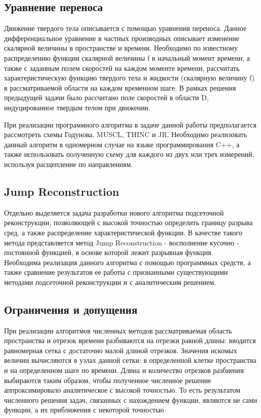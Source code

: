\documentclass[12pt,a4paper]{article}
\begin{document}
\subsection{Уравнение переноса}
Движение твердого тела описывается с помощью уравнения переноса. Данное дифференциальное уравнение в частных производных описывает изменение скалярной величины в пространстве и времени. 
Необходимо по известному распределению функции скалярной величины f в начальный момент времени, а также с заданным полем скоростей на каждом моменте времени, рассчитать характеристическую функцию твердого тела и жидкости (скалярную величину f) в рассматриваемой области на каждом временном шаге. В рамках решения предыдущей задачи было рассчитано поле скоростей в области D, индуцированное твердым телом при движении.

При реализации программного алгоритма в задаче данной работы предполагается рассмотреть схемы Годунова, MUSCL, THINC и JR. Необходимо реализовать данный алгоритм в одномерном случае на языке программирования C++, а также использовать полученную схему для каждого из двух или трех измерений, используя расщепление по направлениям.

\subsection{Jump Reconstruction}
Отдельно выделяется задача разработки нового алгоритма подсеточной реконструкции, позволяющей с высокой точностью определить границу разрыва сред, а также распределение характеристической функции. В качестве такого метода представляется метод Jump Reconstruction - восполнение кусочно - постоянной функцией, в основе которой лежит разрывная функция.\\
Необходима реализация данного алгоритма с помощью программных средств, а также сравнение результатов ее работы с признанными существующими методами подсеточной реконструкции и с аналитическим решением.

\subsection{Ограничения и допущения}
При реализации алгоритмов численных методов рассматриваемая область пространства и отрезок времени разбиваются на отрезки равной длины: вводится равномерная сетка с достаточно малой длиной отрезков. Значения искомых величин вычисляются в узлах данной сетки: в определенной клетке пространства и на определенном шаге по времени. Длина и количество отрезков разбиения выбираются таким образом, чтобы полученное численное решение аппроксимировало аналитическое с высокой точностью. То есть результатом численного решения задач, связанных с нахождением функции, являются не сами функции, а их приближения с некоторой точностью.
\end{document}
